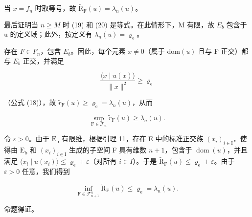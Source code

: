 当 \(x = f_{n}\) 时取等号，故 \(\widetilde{\mathrm{R}}_{\mathrm{F}}(u) = \lambda_{n}(u)\)。

最后证明当 \(n \geqslant M\) 时 (19) 和 (20) 是等式。在此情形下，M 有限，故 \(E_{b}\) 包含于 u 的定义域；此外，按定义有 \(\lambda_{n}(u) = \varrho_{\mathrm{e}}\)。

 存在 \(F \in F_{n}\)，包含 \(E_{b}\)。因此，每个元素 \(x \neq 0\)（属于 \(\text{dom}(u)\) 且与 F 正交）都与 \(E_{b}\) 正交，并满足

\[
\frac {\langle x \mid u (x) \rangle}{\| x \| ^ {2}} \geqslant \varrho_ {\mathrm{e}}
\]

（公式 (18)），故 \(\widetilde{r}_{\mathrm{F}}(u) \geqslant \varrho_{\mathrm{e}} = \lambda_n(u)\)，从而

\[
\sup _ {\mathrm{F} \in \mathcal {F} _ {n}} \widetilde {r} _ {\mathrm{F}} (u) \geqslant \lambda_ {n} (u).
\]

令 \(\varepsilon > 0\)。由于 \(\mathrm{E_b}\) 有限维，根据引理 11，存在 E 中的标准正交族 \((x_i)_{i \in \mathrm{I}}\)，使得由 \(\mathrm{E_b}\) 和 \((x_i)_{i \in \mathrm{I}}\) 生成的子空间 F 具有维数 \(n + 1\)，包含于 \(\operatorname{dom}(u)\)，并且满足 \(\langle x_{i} \mid u(x_{i})\rangle \leqslant \varrho_{\mathrm{e}} + \varepsilon\)（对所有 \(i \in I\)）。于是 \(\widetilde{\mathrm{R}}_{\mathrm{F}}(u) \leqslant \varrho_{\mathrm{e}} + \varepsilon\)。由于 \(\varepsilon > 0\) 任意，我们得到

\[
\inf _ {\mathrm{F} \in \mathcal {F} _ {n + 1} ^ {u}} \widetilde {\mathrm{R}} _ {\mathrm{F}} (u) \leqslant \varrho_ {\mathrm{e}} = \lambda_ {n} (u).
\]

命题得证。

